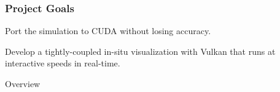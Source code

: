 \begin{frame}
    \frametitle{Project Goals}
\begin{center}

{\LARGE Port the simulation to CUDA without losing accuracy.}

\vspace{0.5in}


{\LARGE Develop a {tightly-coupled in-situ} visualization
with {Vulkan}\vspace{1em}
that runs at {interactive speeds} in {real-time}.}

\vspace{1in}
\end{center}
\end{frame}

\begin{frame}{Overview}
    
\end{frame}